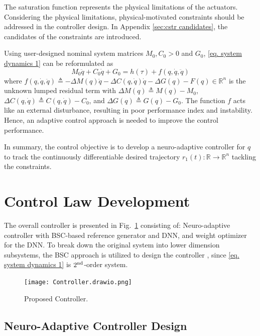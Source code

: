 \documentclass[lettersize,journal]{IEEEtran}
\begin{document}
The saturation function represents the physical limitations of the actuators.
Considering the physical limitations, physical-motivated constraints should be addressed in the controller design.
In Appendix \ref{sec:cstr candidates}, the candidates of the constraints are introduced.

Using user-designed nominal system matrices $M_0,C_0>0$ and $G_0$, \eqref{eq. system dynamics 1} can be reformulated as
\begin{equation}
    M_0\ddot q+C_0\dot q+G_0 = h(\tau) + f(q,\dot q,\ddot q)
    \label{eq. system dynamics 2}
\end{equation}
where $f(q,\dot q,\ddot q) \triangleq -\Delta M(q)\ddot q-\Delta C(q,\dot q)\dot q -\Delta G(q) -F(q)\in\mathbb{R}^n$ is the unknown lumped residual term with $\Delta M(q)\triangleq M(q)-M_0$, $\Delta C(q,\dot q)\triangleq C(q,\dot q)-C_0$, and $\Delta G(q)\triangleq G(q)-G_0$. 
The function $f$ acts like an external disturbance, resulting in poor performance index and instability.
Hence, an adaptive control approach is needed to improve the control performance.

In summary, the control objective is to develop a neuro-adaptive controller for $q$ to track the continuously differentiable desired trajectory $r_1(t): \mathbb{R} \to \mathbb{R}^n$ tackling the constraints.

\section{Control Law Development}\label{sec:ctrl design}

The overall controller is presented in Fig.~\ref{fig: controller} consisting of:
Neuro-adaptive controller with BSC-based reference generator and DNN, and weight optimizer for the DNN.
To break down the original system into lower dimension subsystems, the BSC approach is utilized to design the controller \cite{RN38}, since \eqref{eq. system dynamics 1} is $2\textsuperscript{nd}$-order system.

\begin{figure}[!t]
    \centering
    \texttt{[image: Controller.drawio.png]}
    \caption{Proposed Controller.}
    \label{fig: controller}
\end{figure}

\subsection{Neuro-Adaptive Controller Design}
\end{document}

